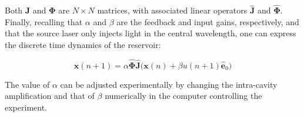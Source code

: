 Both $\mathbf{J}$ and $\mathbf{\Phi}$ are $N\times N$ matrices, with associated linear operators $\hat{\mathbf{J}}$ and $\hat{\mathbf{\Phi}}$. Finally, recalling that $\alpha$ and $\beta$ are the feedback and input gains, respectively, and that the source laser only injects light in the central wavelength, one can express the discrete time dynamics of the reservoir:

\begin{equation}
	\mathbf{x}(n+1) = \alpha \hat{\mathbf{\Phi}} \hat{\mathbf{J}}\bigg( \mathbf{x}(n) + \beta u(n+1) \hat{\mathbf{e}}_0\bigg)
	\label{model-reservoir}
\end{equation}

The value of $\alpha$ can be adjusted experimentally by changing the intra-cavity amplification and that of $\beta$ numerically in the computer controlling the experiment. 